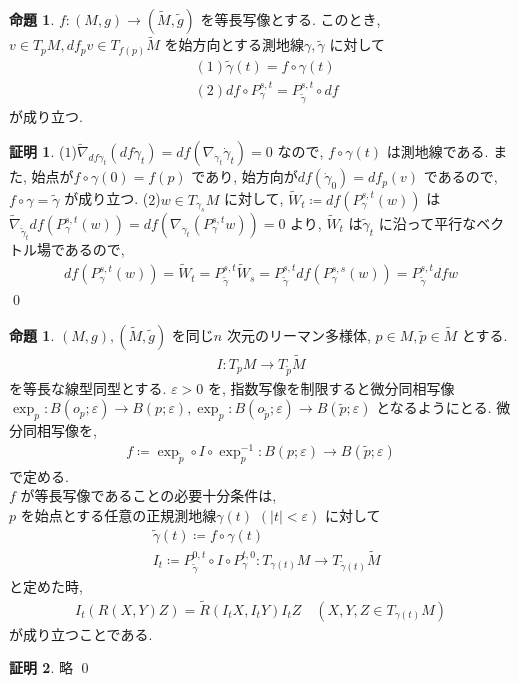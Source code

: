 \documentclass[twocolumn, landscape, a4paper , 8pt, fleqn, titlepage ]{jsarticle}
\theoremstyle{definition}
\newtheorem{prop}[dfn]{命題}
\newtheorem*{pf*}{証明}
\newcommand{\veps}{\varepsilon}
\newcommand{\abs}[1]{\left|#1\right|}
\begin{document}
\begin{prop}
$f: (M,g) \rightarrow (\tilde M, \tilde g)$ を等長写像とする. このとき, $v \in T_pM, df_p v \in T_{f(p)} \tilde M$ を始方向とする測地線$\gamma, \tilde \gamma$ に対して
\begin{align*} &(1) \tilde \gamma (t) = f \circ \gamma (t) \\&(2)df\circ P_{\gamma}^{s,t} = P_{\tilde \gamma}^{s,t}\circ df \end{align*}
が成り立つ.
\end{prop}
\begin{pf*}
($1$)$\tilde \nabla_{df \dot \gamma_t} (df \dot \gamma_t) = df (\nabla_{\dot \gamma_t} \dot \gamma_t) = 0$ なので, $f\circ \gamma (t) $ は測地線である. また, 始点が$f \circ \gamma (0) = f(p)$ であり, 始方向が$df(\dot \gamma_0) = df_p (v)$ であるので, $f\circ \gamma = \tilde \gamma$ が成り立つ. ($2$)$w \in T_{\gamma_s} M$ に対して, $\tilde W _t \coloneqq df(P_{\gamma}^{s,t}(w))$ は$\tilde \nabla_{\dot{\tilde \gamma}_t} df(P_{\gamma}^{s,t}(w)) = df(\nabla_{\dot \gamma_t} (P_{\gamma}^{s,t} w)) = 0$ より, $\tilde W_t$ は$\tilde \gamma_t$ に沿って平行なベクトル場であるので, 
\begin{align*}df(P_{\gamma}^{s,t}(w)) =  \tilde W_t = P_{\tilde \gamma}^{s,t} \tilde W_s  = P_{\tilde \gamma}^{s,t} df(P_{\gamma}^{s,s}(w)) = P_{\tilde \gamma}^{s,t} dfw \end{align*} 
\qed
\end{pf*}


\begin{prop} $(M,g), (\tilde M, \tilde g)$ を同じ$n$ 次元のリーマン多様体, $p \in M, \tilde p \in \tilde M$ とする. 
\begin{align*}I: T_pM \rightarrow T_{\tilde p} \tilde M \end{align*}
を等長な線型同型とする. $\veps > 0$ を, 指数写像を制限すると微分同相写像
$\exp_p : B(o_p; \veps) \rightarrow B(p; \veps), \exp_p : B(o_{\tilde p}; \veps) \rightarrow B(\tilde p; \veps) $ となるようにとる. 微分同相写像を, 
\begin{align*} f \coloneqq \exp_{\tilde p} \circ I \circ \exp_p^{-1} : B(p ; \veps) \rightarrow B(\tilde p ; \veps) \end{align*}
で定める. \\
$f$ が等長写像であることの必要十分条件は, \\
$p$ を始点とする任意の正規測地線$\gamma(t) \,\, (\abs t < \veps)$ に対して
\begin{align*} &\tilde \gamma (t) \coloneqq f \circ \gamma (t) \\&I_t \coloneqq P_{\tilde \gamma }^{0,t} \circ I \circ P_{\gamma }^{t,0} : T_{\gamma(t)} M \rightarrow T_{\tilde \gamma (t)} \tilde M  \end{align*}
と定めた時, 
\begin{align*} I_t (R(X,Y)Z) = \tilde R (I_t X, I_t Y) I_t Z\quad (X,Y,Z \in T_{\gamma (t)} M) \end{align*}
 が成り立つことである. 

\end{prop}
\begin{pf*}
略
\qed
\end{pf*}
\end{document}
